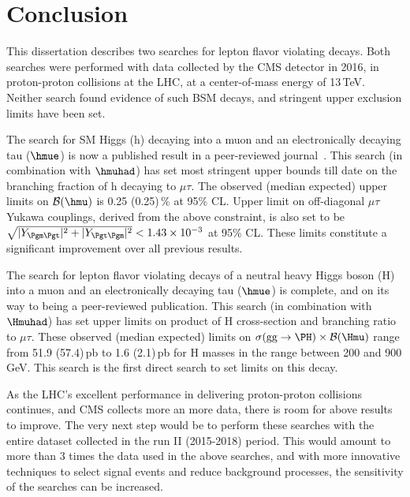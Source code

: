 %
%

\chapter{Conclusion}
\label{conclusion}

This dissertation describes two searches for lepton flavor violating decays. Both searches were performed with data collected by the CMS detector in 2016, in proton-proton collisions at the LHC, at a center-of-mass energy of 13\,TeV. Neither search found evidence of such BSM decays, and stringent upper exclusion limits have been set.

The search for SM Higgs (h) decaying into a muon and an electronically decaying tau ($\hmue$) is now a published result in a peer-reviewed journal~\cite{HIG-17-001}. This search (in combination with $\hmuhad$) has set most stringent upper bounds till date on the branching fraction of h decaying to $\mu\tau$. The observed (median expected) upper limits on $\mathcal{B}(\hmu)$ is 0.25 (0.25)\,\% at 95\% CL. Upper limit on off-diagonal $\mu\tau$ Yukawa couplings, derived from the above constraint, is also set to be $\sqrt{|Y_{\Pgm\Pgt}|^{2}+|Y_{\Pgt\Pgm}|^{2}}<1.43\times 10^{-3}$ at 95\% CL. These limits constitute a significant improvement over all previous results.

The search for lepton flavor violating decays of a neutral heavy Higgs boson (H) into a muon and an electronically decaying tau ($\hmue$) is complete, and on its way to being a peer-reviewed publication. This search (in combination with $\Hmuhad$) has set upper limits on product of H cross-section and branching ratio to $\mu\tau$. These observed (median expected) limits on $\sigma(\textrm{gg}\rightarrow \PH)\times\mathcal{B}(\Hmu)$ range from 51.9 (57.4)\,pb to 1.6 (2.1)\,pb for H masses in the range between 200 and 900 GeV. This search is the first direct search to set limits on this decay.

As the LHC's excellent performance in delivering proton-proton collisions continues, and CMS collects more an more  data, there is room for above results to improve. The very next step would be to perform these searches with the entire dataset collected in the run II (2015-2018) period. This would amount to more than 3 times the data used in the above searches, and with more innovative techniques to select signal events and reduce background processes, the sensitivity of the searches can be increased. 






